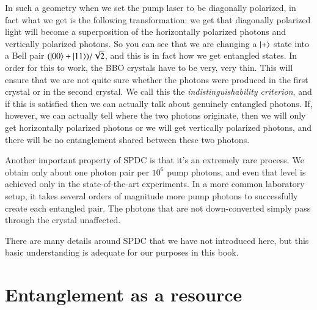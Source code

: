 In such a geometry when we set the pump laser to be diagonally polarized, in fact what we get is the following transformation: we get that diagonally polarized light will become a superposition of the horizontally polarized photons and vertically polarized photons. So you can see that we are changing a $\ket{+}$ state into a Bell pair $(\ket{00}+\ket{11})/\sqrt{2}$, and this is in fact how we get entangled states.  In order for this to work, the BBO crystals have to be very, very thin. This will ensure that we are not quite sure whether the photons were produced in the first crystal or in the second crystal. We call this the \emph{indistinguishability criterion}, and if this is satisfied then we can actually talk about genuinely entangled photons. If, however, we can actually tell where the two photons originate, then we will only get horizontally polarized photons or we will get vertically polarized photons, and there will be no entanglement shared between these two photons. 

Another important property of SPDC is that it's an extremely rare process.  We obtain only about one photon pair per $10^6$ pump photons, and even that level is achieved only in the state-of-the-art experiments. In a more common laboratory setup, it takes several orders of magnitude more pump photons to successfully create each entangled pair.  The photons that are not down-converted simply pass through the crystal unaffected.

There are many details around SPDC that we have not introduced here, but this basic understanding is adequate for our purposes in this book.



\section{Entanglement as a resource}

